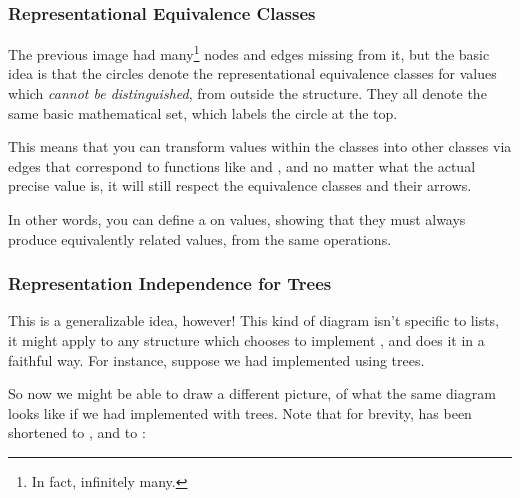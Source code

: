 \documentclass[aspectratio=169, handout]{beamer}
\begin{document}
\begin{frame}[fragile]
  \frametitle{Representational Equivalence Classes}

  \ptmt

  The previous image had many\footnote{In fact, infinitely many.} nodes and edges missing from it,
  but the basic idea is that the circles denote the representational equivalence
  classes for values which \textit{cannot be distinguished}, from outside
  the structure. They all denote the same basic mathematical set, which labels
  the circle at the top.

  \pause
  \vspace{\fill}

  This means that you can transform values within the classes into other classes
  via edges that correspond to functions like  and
  , and no matter what the actual precise value is, it
  will still respect the equivalence classes and their arrows.

  \pause
  \vspace{\fill}

  In other words, you can define a  on values, showing that
  they must always produce equivalently related values, from the same
  operations.
\end{frame}

\begin{frame}[fragile]
  \frametitle{Representation Independence for Trees}

  This is a generalizable idea, however! This kind of diagram isn't
  specific to lists, it might apply to any structure which chooses to
  implement , and does it in a faithful way. For instance,
  suppose we had implemented  using trees.

  \pause
  \vspace{\fill}

  So now we might be able to draw a different picture, of what the same
  diagram looks like if we had implemented  with trees. Note
  that for brevity,  has been shortened to , and
   to :
\end{frame}
\end{document}
